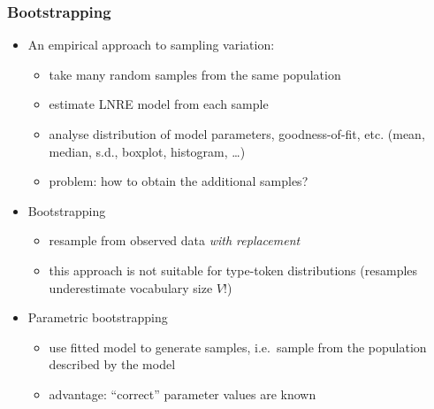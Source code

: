 \documentclass[t]{beamer} %
\begin{document}
\begin{frame}
  \frametitle{Bootstrapping}

  \begin{itemize}
  \item<1-> An empirical approach to sampling variation:
    \begin{itemize}
    \item take many random samples from the same population
    \item estimate LNRE model from each sample
    \item analyse distribution of model parameters, goodness-of-fit, etc.
      (mean, median, s.d., boxplot, histogram, \ldots)
    \item problem: how to obtain the additional samples?
    \end{itemize}
  \item<2-> Bootstrapping \citep{Efron:79}
    \begin{itemize}
    \item resample from observed data \emph{with replacement}
    \item this approach is not suitable for type-token distributions
      (resamples underestimate vocabulary size $V$!)
    \end{itemize}
  \item<3-> Parametric bootstrapping
    \begin{itemize}
    \item use fitted model to generate samples, i.e.\ sample from the population described by the model
    \item advantage: ``correct'' parameter values are known
    \end{itemize}
  \end{itemize}
\end{frame}
\end{document}
